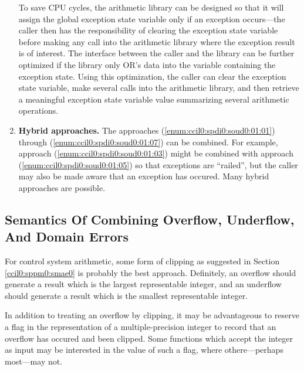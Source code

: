 \begin{enumerate}
      To save CPU cycles, the arithmetic library can 
      be designed so that it will assign the global exception state variable only if an 
      exception occurs---the caller then has the responsibility of clearing the exception
      state variable before making any call into the arithmetic library where the 
      exception result is of interest.  The interface between the caller and the library
      can be further optimized if the library only OR's data into the variable containing
      the exception state.  Using this optimization, the caller can clear the exception state 
      variable, make several calls into the arithmetic library, and then retrieve a meaningful
      exception state variable value summarizing several arithmetic operations.
\item \label{enum:ccil0:spdi0:soud0:01:08}
      \textbf{Hybrid approaches.}
      The approaches (\ref{enum:ccil0:spdi0:soud0:01:01})
      through (\ref{enum:ccil0:spdi0:soud0:01:07}) can be combined.
      For example, approach (\ref{enum:ccil0:spdi0:soud0:01:03})
      might be combined with approach (\ref{enum:ccil0:spdi0:soud0:01:05})
      so that exceptions are ``railed'', but the caller may also be made
      aware that an exception has occured.  Many hybrid approaches are possible.
\end{enumerate}


\subsection{Semantics Of Combining Overflow, Underflow, And Domain Errors}
\label{ccil0:spdi0:scmb0}

For control system arithmetic, some form of clipping as suggested
in Section \ref{ccil0:sppm0:smae0} is probably the 
best approach.  Definitely, an overflow should generate a result
which is the largest representable integer, and an
underflow should generate a result which is the smallest
representable integer.

In addition to treating an overflow by clipping, it may be 
advantageous to reserve a flag in the representation of a
multiple-precision integer to record that an overflow has occured and been clipped.
Some functions which accept the integer as input may be interested
in the value of such a flag, where othere---perhaps most---may
not.

